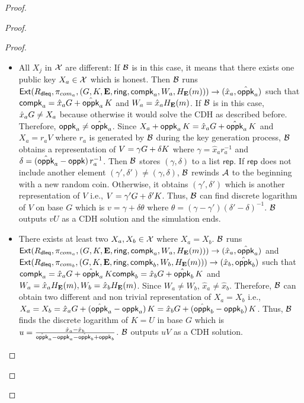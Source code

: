 \begin{proof}
\begin{proof}
\begin{proof}
			\begin{itemize}
				\item All $ X_j$ in $ {\mathcal{X}} $ are different: If $ \mathcal{B} $ is in this case, it means that there exists one public key $ X_a \in {\ensuremath{\mathcal{X}}} $ which is honest. Then $ \mathcal{B} $ runs $ \mathsf{Ext}(R_{\mathsf{dleq}},\pi_{com_a},(G,K,{\mathbf{E}},\mathsf{ring}, \mathsf{compk}_a,W_a,H_{\mathbf{E}}(m))) \rightarrow (\hat{x}_a,\hat{\mathsf{oppk}}_a )$ such that $ \mathsf{compk}_a = \hat{x}_aG + \hat{\mathsf{oppk}}_a \,K $ and $ W_a = \hat{x}_a H_{\mathbf{E}}(m) $.  If $ \mathcal{B} $ is in this case, $ \hat{x}_aG\neq X_a $ because otherwise it would solve the CDH as described before. Therefore, $ \mathsf{oppk}_a \neq \hat{\mathsf{oppk}}_a $. Since $ X_a + \mathsf{oppk}_a \, K = \hat{x}_aG + \hat{\mathsf{oppk}}_a \,K  $ and $ X_a = r_aV $ where $ r_a $ is generated by $ \mathcal{B} $ during the key generation process, $ \mathcal{B} $ obtains a representation of $ V = \gamma G + \delta K $ where $ \gamma = \hat{x}_ar^{-1}_a  $ and $ \delta = (\hat{\mathsf{oppk}}_a -\mathsf{oppk})\,r_a^{-1} $. Then $ \mathcal{B} $ stores $ (\gamma, \delta) $ to a list $ \mathsf{rep} $. If $ \mathsf{rep} $ does not include another element $ (\gamma', \delta')  \neq (\gamma, \delta) $, $ \mathcal{B} $ rewinds $ \mathcal{A} $ to the beginning with a new random coin.  Otherwise, it obtains $ (\gamma', \delta') $ which is another representation of $ V $ i.e., $ V = \gamma' G + \delta' K $. Thus, $ \mathcal{B} $ can find discrete logarithm of $ V $ on base $ G $ which is $ v = \gamma + \delta \theta $ where $ \theta = (\gamma - \gamma')(\delta' - \delta)^{-1} $. $ \mathcal{B} $ outputs $ vU $ as a CDH solution and the simulation ends.
				
				
				\item There exists at least two $ X_a,X_b \in {\ensuremath{\mathcal{X}}} $ where $ X_a = X_b $. $ \mathcal{B} $ runs $ \mathsf{Ext}(R_{\mathsf{dleq}},\pi_{com_a},(G,K,{\mathbf{E}},\mathsf{ring}, \mathsf{compk}_a,W_a,H_{\mathbf{E}}(m))) \rightarrow (\hat{x}_a,\hat{\mathsf{oppk}}_a )$ and $ \mathsf{Ext}(R_{\mathsf{dleq}},\pi_{com_b},(G,K,{\mathbf{E}},\mathsf{ring}, \mathsf{compk}_b,W_b,H_{\mathbf{E}}(m))) \rightarrow (\hat{x}_b,\hat{\mathsf{oppk}}_b )$ such that $ \mathsf{compk}_a = \hat{x}_aG + \hat{\mathsf{oppk}}_a \, K \mathsf{compk}_b = \hat{x}_bG + \hat{\mathsf{oppk}}_b \, K $ and $ W_a = \hat{x}_a H_{\mathbf{E}}(m), W_b = \hat{x}_b H_{\mathbf{E}}(m) $. Since $ W_a \neq W_b $, $ \hat{x}_a \neq \hat{x}_b $.  Therefore, $ \mathcal{B} $ can obtain  two different and non trivial representation of $ X_a = X_b $ i.e., $ X_a = X_b = \hat{x}_aG + (\hat{\mathsf{oppk}}_a - \mathsf{oppk}_a) \, K = \hat{x}_bG + (\hat{\mathsf{oppk}}_b - \mathsf{oppk}_b) \, K  $. Thus, $ \mathcal{B} $ finds the discrete logarithm of $ K = U $ in base $ G $ which is $ u = \frac{\hat{x}_a - \hat{x}_b}{\hat{\mathsf{oppk}}_a -\mathsf{oppk}_a -\hat{\mathsf{oppk}}_b + \mathsf{oppk}_b} $. $ \mathcal{B} $ outputs $ uV $ as a CDH solution.
			\end{itemize}
			

\end{proof}
\end{proof}
\end{proof}
